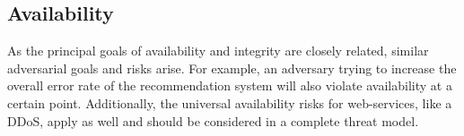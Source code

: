 \subsection{Availability}
As the principal goals of availability and integrity are closely related, similar adversarial goals and risks arise. For example, an adversary trying to increase the overall error rate of the recommendation system will also violate availability at a certain point. Additionally, the universal availability risks for web-services, like a \ac{DDoS}, apply as well and should be considered in a complete threat model.

